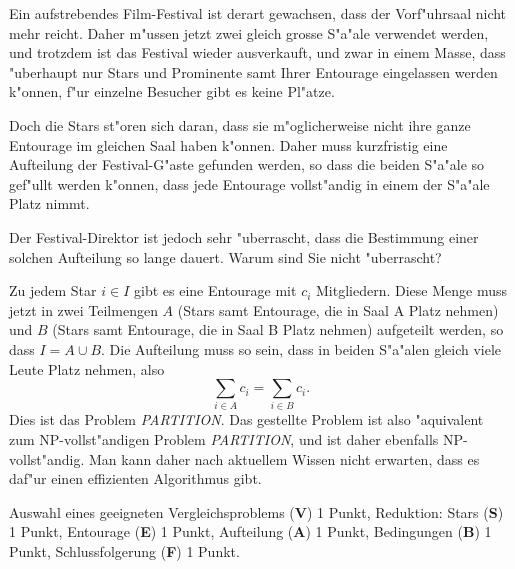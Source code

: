 Ein aufstrebendes Film-Festival ist derart gewachsen, dass der 
Vorf"uhrsaal nicht mehr reicht. Daher m"ussen jetzt zwei gleich
grosse S"a"ale verwendet werden, und trotzdem ist das Festival
wieder ausverkauft, und zwar in einem Masse, dass "uberhaupt nur Stars und Prominente
samt Ihrer Entourage eingelassen werden k"onnen, f"ur
einzelne Besucher gibt es keine Pl"atze.

Doch die Stars st"oren sich daran, dass sie m"oglicherweise nicht
ihre ganze Entourage im gleichen Saal haben k"onnen. Daher muss
kurzfristig eine Aufteilung der Festival-G"aste gefunden werden,
so dass die beiden S"a"ale so gef"ullt werden k"onnen, dass
jede Entourage vollst"andig in einem der S"a"ale Platz nimmt.

Der Festival-Direktor ist jedoch sehr "uberrascht, dass die
Bestimmung einer solchen Aufteilung so lange dauert. Warum
sind Sie nicht "uberrascht?

\begin{loesung}
Zu jedem Star $i\in I$ gibt es eine Entourage mit $c_i$
Mitgliedern. Diese Menge muss jetzt in zwei Teilmengen
$A$ (Stars samt Entourage, die in Saal A Platz nehmen) und
$B$ (Stars samt Entourage, die in Saal B Platz nehmen) aufgeteilt
werden, so dass $I=A\cup B$. Die Aufteilung muss so sein, dass
in beiden S"a"alen gleich viele Leute Platz nehmen, also
\[
\sum_{i\in A}c_i=
\sum_{i\in B}c_i.
\]
Dies ist das Problem {\it PARTITION}. Das gestellte Problem ist also
"aquivalent zum NP-vollst"andigen Problem {\it PARTITION}, und ist
daher ebenfalls NP-vollst"andig. Man kann daher nach aktuellem
Wissen nicht erwarten, dass es daf"ur einen effizienten Algorithmus
gibt.
\end{loesung}

\begin{bewertung}
Auswahl eines geeigneten Vergleichsproblems ({\bf V}) 1 Punkt,
Reduktion: Stars ({\bf S}) 1 Punkt, Entourage ({\bf E}) 1 Punkt,
Aufteilung ({\bf A}) 1 Punkt,
Bedingungen ({\bf B}) 1 Punkt,
Schlussfolgerung ({\bf F}) 1 Punkt.
\end{bewertung}
